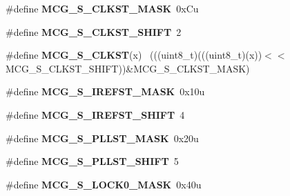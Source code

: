\begin{DoxyCompactItemize}
\item 
\hypertarget{group___m_c_g___register___masks_gaf43507c78cdda211a04b5ae0509edb2e}{}\#define {\bfseries M\+C\+G\+\_\+\+S\+\_\+\+C\+L\+K\+S\+T\+\_\+\+M\+A\+S\+K}~0x\+Cu\label{group___m_c_g___register___masks_gaf43507c78cdda211a04b5ae0509edb2e}

\item 
\hypertarget{group___m_c_g___register___masks_gab0768a667adb2dc2e1fb7972f9fd85a4}{}\#define {\bfseries M\+C\+G\+\_\+\+S\+\_\+\+C\+L\+K\+S\+T\+\_\+\+S\+H\+I\+F\+T}~2\label{group___m_c_g___register___masks_gab0768a667adb2dc2e1fb7972f9fd85a4}

\item 
\hypertarget{group___m_c_g___register___masks_gabb753abc57dbb658ff413c418d8b68c8}{}\#define {\bfseries M\+C\+G\+\_\+\+S\+\_\+\+C\+L\+K\+S\+T}(x)                                                  ~(((uint8\+\_\+t)(((uint8\+\_\+t)(x))$<$$<$M\+C\+G\+\_\+\+S\+\_\+\+C\+L\+K\+S\+T\+\_\+\+S\+H\+I\+F\+T))\&M\+C\+G\+\_\+\+S\+\_\+\+C\+L\+K\+S\+T\+\_\+\+M\+A\+S\+K)\label{group___m_c_g___register___masks_gabb753abc57dbb658ff413c418d8b68c8}

\item 
\hypertarget{group___m_c_g___register___masks_ga5bf822a90d9c1e67d5297420157e1dd0}{}\#define {\bfseries M\+C\+G\+\_\+\+S\+\_\+\+I\+R\+E\+F\+S\+T\+\_\+\+M\+A\+S\+K}~0x10u\label{group___m_c_g___register___masks_ga5bf822a90d9c1e67d5297420157e1dd0}

\item 
\hypertarget{group___m_c_g___register___masks_ga4a2727883c339845e709dacc0c2fd71a}{}\#define {\bfseries M\+C\+G\+\_\+\+S\+\_\+\+I\+R\+E\+F\+S\+T\+\_\+\+S\+H\+I\+F\+T}~4\label{group___m_c_g___register___masks_ga4a2727883c339845e709dacc0c2fd71a}

\item 
\hypertarget{group___m_c_g___register___masks_ga6f176d95968a5b7b1af67ae81734c854}{}\#define {\bfseries M\+C\+G\+\_\+\+S\+\_\+\+P\+L\+L\+S\+T\+\_\+\+M\+A\+S\+K}~0x20u\label{group___m_c_g___register___masks_ga6f176d95968a5b7b1af67ae81734c854}

\item 
\hypertarget{group___m_c_g___register___masks_gafddddab311f8f0cb58e7b7941f6d9a8d}{}\#define {\bfseries M\+C\+G\+\_\+\+S\+\_\+\+P\+L\+L\+S\+T\+\_\+\+S\+H\+I\+F\+T}~5\label{group___m_c_g___register___masks_gafddddab311f8f0cb58e7b7941f6d9a8d}

\item 
\hypertarget{group___m_c_g___register___masks_ga6cb486757d45c5211baa3b130e720b97}{}\#define {\bfseries M\+C\+G\+\_\+\+S\+\_\+\+L\+O\+C\+K0\+\_\+\+M\+A\+S\+K}~0x40u\label{group___m_c_g___register___masks_ga6cb486757d45c5211baa3b130e720b97}


\end{DoxyCompactItemize}
